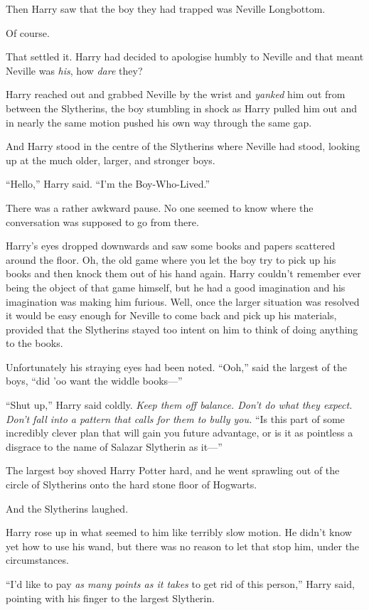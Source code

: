 Then Harry saw that the boy they had trapped was Neville Longbottom.

Of course.

That settled it. Harry had decided to apologise humbly to Neville and
that meant Neville was \emph{his}, how \emph{dare} they?

Harry reached out and grabbed Neville by the wrist and \emph{yanked} him
out from between the Slytherins, the boy stumbling in shock as Harry
pulled him out and in nearly the same motion pushed his own way through
the same gap.

And Harry stood in the centre of the Slytherins where Neville had stood,
looking up at the much older, larger, and stronger boys.

``Hello,'' Harry said. ``I'm the Boy-Who-Lived.''

There was a rather awkward pause. No one seemed to know where the
conversation was supposed to go from there.

Harry's eyes dropped downwards and saw some books and papers scattered
around the floor. Oh, the old game where you let the boy try to pick up
his books and then knock them out of his hand again. Harry couldn't
remember ever being the object of that game himself, but he had a good
imagination and his imagination was making him furious. Well, once the
larger situation was resolved it would be easy enough for Neville to
come back and pick up his materials, provided that the Slytherins stayed
too intent on him to think of doing anything to the books.

Unfortunately his straying eyes had been noted. ``Ooh,'' said the
largest of the boys, ``did 'oo want the widdle books---''

``Shut up,'' Harry said coldly. \emph{Keep them off balance. Don't do
what they expect. Don't fall into a pattern that calls for them to bully
you.} ``Is this part of some incredibly clever plan that will gain you
future advantage, or is it as pointless a disgrace to the name of
Salazar Slytherin as it---''

The largest boy shoved Harry Potter hard, and he went sprawling out of
the circle of Slytherins onto the hard stone floor of Hogwarts.

And the Slytherins laughed.

Harry rose up in what seemed to him like terribly slow motion. He didn't
know yet how to use his wand, but there was no reason to let that stop
him, under the circumstances.

``I'd like to pay \emph{as many points as it takes} to get rid of this
person,'' Harry said, pointing with his finger to the largest Slytherin.


